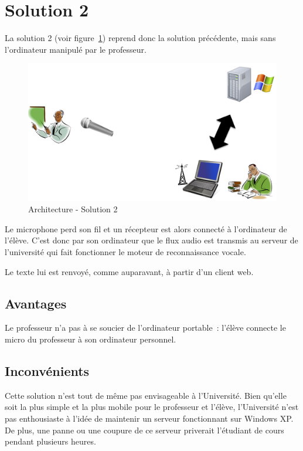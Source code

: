 \section{Solution 2}

La solution 2 (voir figure~\ref{fig:solution2}) reprend donc la solution précédente, mais sans l'ordinateur manipulé par le professeur.

\begin{figure}[h]
 \centering
 \includegraphics[scale=0.5]{./img/solution2.png}
 \caption{Architecture - Solution 2}
 \label{fig:solution2}
\end{figure}

Le microphone perd son fil et un récepteur est alors connecté à l'ordinateur de l'élève.
C'est donc par son ordinateur que le flux audio est transmis au serveur de l'université qui fait fonctionner le moteur de reconnaissance vocale.

Le texte lui est renvoyé, comme auparavant, à partir d'un client web.

\subsection{Avantages}
Le professeur n'a pas à se soucier de l'ordinateur portable~: l'élève connecte le micro du professeur à son ordinateur personnel.

\subsection{Inconvénients}
Cette solution n'est tout de même pas envisageable à l'Université. Bien qu'elle soit la plus simple et la plus mobile pour le professeur et l'élève, l'Université n'est pas enthousiaste à l'idée de maintenir un serveur fonctionnant sur Windows XP.
De plus, une panne ou une coupure de ce serveur priverait l'étudiant de cours pendant plusieurs heures.

